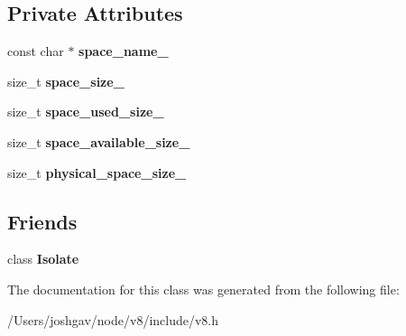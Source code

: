 \subsection*{Private Attributes}
\begin{DoxyCompactItemize}
\item 
const char $\ast$ {\bfseries space\+\_\+name\+\_\+}\hypertarget{classv8_1_1_heap_space_statistics_a042462c62d5789eda4cd8011f43b04e3}{}\label{classv8_1_1_heap_space_statistics_a042462c62d5789eda4cd8011f43b04e3}

\item 
size\+\_\+t {\bfseries space\+\_\+size\+\_\+}\hypertarget{classv8_1_1_heap_space_statistics_a982565762c12d6da18130e808ba7433a}{}\label{classv8_1_1_heap_space_statistics_a982565762c12d6da18130e808ba7433a}

\item 
size\+\_\+t {\bfseries space\+\_\+used\+\_\+size\+\_\+}\hypertarget{classv8_1_1_heap_space_statistics_ad0f8536bb48940cd95115439f02d48b1}{}\label{classv8_1_1_heap_space_statistics_ad0f8536bb48940cd95115439f02d48b1}

\item 
size\+\_\+t {\bfseries space\+\_\+available\+\_\+size\+\_\+}\hypertarget{classv8_1_1_heap_space_statistics_aff413d11dc7b0508cd246ef8e7c804e7}{}\label{classv8_1_1_heap_space_statistics_aff413d11dc7b0508cd246ef8e7c804e7}

\item 
size\+\_\+t {\bfseries physical\+\_\+space\+\_\+size\+\_\+}\hypertarget{classv8_1_1_heap_space_statistics_a961f81a0bdac0ffd6aa7d550d53d9e9b}{}\label{classv8_1_1_heap_space_statistics_a961f81a0bdac0ffd6aa7d550d53d9e9b}

\end{DoxyCompactItemize}
\subsection*{Friends}
\begin{DoxyCompactItemize}
\item 
class {\bfseries Isolate}\hypertarget{classv8_1_1_heap_space_statistics_aba4f0964bdacf2bbf62cf876e5d28d0a}{}\label{classv8_1_1_heap_space_statistics_aba4f0964bdacf2bbf62cf876e5d28d0a}

\end{DoxyCompactItemize}


The documentation for this class was generated from the following file\+:\begin{DoxyCompactItemize}
\item 
/\+Users/joshgav/node/v8/include/v8.\+h\end{DoxyCompactItemize}
